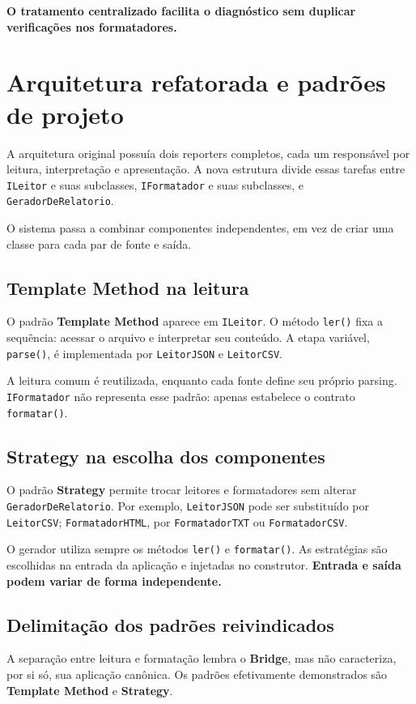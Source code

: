 \documentclass[12pt,a4paper]{article}
\begin{document}
\textbf{O tratamento centralizado facilita o diagnóstico sem duplicar verificações nos formatadores.}

\section{Arquitetura refatorada e padrões de projeto}
A arquitetura original possuía dois reporters completos, cada um responsável por leitura, interpretação e apresentação. A nova estrutura divide essas tarefas entre \texttt{ILeitor} e suas subclasses, \texttt{IFormatador} e suas subclasses, e \texttt{GeradorDeRelatorio}.

O sistema passa a combinar componentes independentes, em vez de criar uma classe para cada par de fonte e saída.

\subsection{Template Method na leitura}
O padrão \textbf{Template Method} aparece em \texttt{ILeitor}. O método \texttt{ler()} fixa a sequência: acessar o arquivo e interpretar seu conteúdo. A etapa variável, \texttt{parse()}, é implementada por \texttt{LeitorJSON} e \texttt{LeitorCSV}.

A leitura comum é reutilizada, enquanto cada fonte define seu próprio parsing. \texttt{IFormatador} não representa esse padrão: apenas estabelece o contrato \texttt{formatar()}.

\subsection{Strategy na escolha dos componentes}
O padrão \textbf{Strategy} permite trocar leitores e formatadores sem alterar \texttt{GeradorDeRelatorio}. Por exemplo, \texttt{LeitorJSON} pode ser substituído por \texttt{LeitorCSV}; \texttt{FormatadorHTML}, por \texttt{FormatadorTXT} ou \texttt{FormatadorCSV}.

O gerador utiliza sempre os métodos \texttt{ler()} e \texttt{formatar()}. As estratégias são escolhidas na entrada da aplicação e injetadas no construtor. \textbf{Entrada e saída podem variar de forma independente.}

\subsection{Delimitação dos padrões reivindicados}
A separação entre leitura e formatação lembra o \textbf{Bridge}, mas não caracteriza, por si só, sua aplicação canônica. Os padrões efetivamente demonstrados são \textbf{Template Method} e \textbf{Strategy}.
\end{document}
